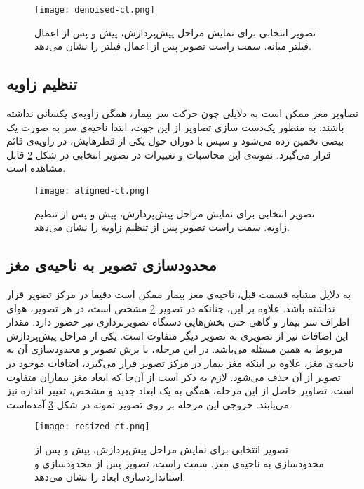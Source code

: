 \begin{figure}[ht]
\centering
\texttt{[image: denoised-ct.png]}
\caption[]{تصویر انتخابی برای نمایش مراحل پیش‌پردازش، پیش و پس از اعمال فیلتر میانه. سمت راست تصویر پس از اعمال فیلتر را نشان می‌دهد.}
\label{fig:denoised-ct}
\end{figure}
    
\subsection{تنظیم زاویه}
تصاویر مغز ممکن است به دلایلی چون حرکت سر بیمار، همگی زاویه‌ی یکسانی نداشته باشند.
به منظور یک‌دست سازی تصاویر از این جهت، ابتدا ناحیه‌ی سر به صورت یک بیضی تخمین زده می‌شود و سپس با دوران حول یکی از قطر‌هایش، در زاویه‌ی قائم قرار می‌گیرد.
نمونه‌ی این محاسبات و تغییرات در تصویر انتخابی در شکل \ref{fig:aligned-ct}
قابل مشاهده است.

\begin{figure}[ht]
\centering
\texttt{[image: aligned-ct.png]}
\caption[]{تصویر انتخابی برای نمایش مراحل پیش‌پردازش، پیش و پس از تنظیم زاویه. سمت راست تصویر پس از تنظیم زاویه را نشان می‌دهد.}
\label{fig:aligned-ct}
\end{figure}

\subsection{محدودسازی تصویر به ناحیه‌ی مغز}
به دلایل مشابه قسمت قبل، ناحیه‌ی مغز بیمار ممکن است دقیقا در مرکز تصویر قرار نداشته باشد.
علاوه بر این، چنانکه در تصویر \ref{fig:aligned-ct} مشخص است، 
در هر تصویر، هوای اطراف سر بیمار و گاهی حتی بخش‌هایی دستگاه تصویربرداری نیز حضور دارد.
مقدار این اضافات نیز از تصویری به تصویر دیگر متفاوت است.
یکی از مراحل پیش‌پردازش مربوط به همین مسئله می‌باشد.
در این مرحله،
با برش تصویر و محدودسازی آن به ناحیه‌ی مغز،
علاوه بر اینکه مغز بیمار در مرکز تصویر قرار می‌گیرد، اضافات موجود در تصویر از آن حذف می‌شود.
لازم به ذکر است از آن‌جا که ابعاد مغز بیماران متفاوت است، تصاویر حاصل از این مرحله، همگی به یک ابعاد جدید و مشخص، تغییر اندازه نیز می‌یابند.
خروجی این مرحله بر روی تصویر نمونه در شکل 
\ref{fig:resized-ct}
آمده‌است.

\begin{figure}[ht]
\centering
\texttt{[image: resized-ct.png]}
\caption[]{تصویر انتخابی برای نمایش مراحل پیش‌پردازش، پیش و پس از محدودسازی به ناحیه‌ی مغز. سمت راست، تصویر پس از محدودسازی و استانداردسازی ابعاد را نشان می‌دهد.}
\label{fig:resized-ct}
\end{figure}

